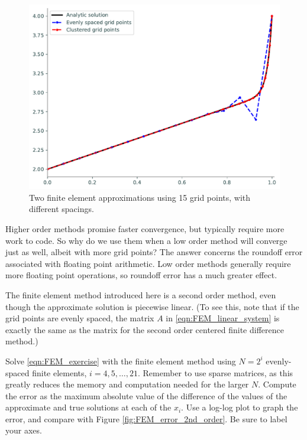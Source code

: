 \begin{figure}[ht]
\centering
\includegraphics[width=\textwidth]{figures/FEM_compare_methods.pdf}
\caption{Two finite element approximations using 15 grid points, with different spacings. }
\label{fig:FEM_compare_methods}
\end{figure}

\begin{problem}
\label{prob:FEM_accuracy_comparison}
Higher order methods promise faster convergence, but typically require more work to code.
So why do we use them when a low order method will converge just as well, albeit with more grid points?
The answer concerns the roundoff error associated with floating point arithmetic.
Low order methods generally require more floating point operations, so roundoff error has a much greater effect.

The finite element method introduced here is a second order method, even though the approximate solution is piecewise linear.
(To see this, note that if the grid points are evenly spaced, the matrix $A$ in \eqref{eqn:FEM_linear_system} is exactly the same as the matrix for the second order centered finite difference method.)

Solve \eqref{eqn:FEM_exercise} with the finite element method using $N = 2^i$ evenly-spaced finite elements, $i = 4, 5, \ldots, 21$.
Remember to use sparse matrices, as this greatly reduces the memory and computation needed for the larger \(N\).
Compute the error as the maximum absolute value of the difference of the values of the approximate and true solutions at each of the \(x_i\).
Use a log-log plot to graph the error, and compare with Figure \ref{fig:FEM_error_2nd_order}.
Be sure to label your axes.
\end{problem}



